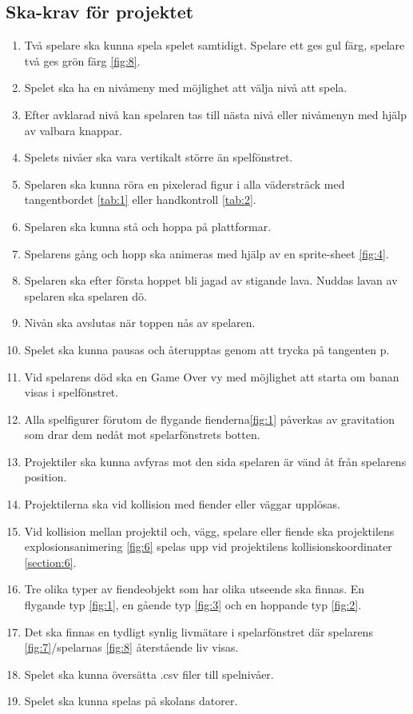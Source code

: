 \documentclass{TDP005mall}
\begin{document}
\subsection{Ska-krav för projektet} %
\begin{enumerate}
\item Två spelare ska kunna spela spelet samtidigt. Spelare ett ges gul färg, spelare två ges grön färg \ref{fig:8}.
\item Spelet ska ha en nivåmeny med möjlighet att välja nivå att spela.
\item Efter avklarad nivå kan spelaren tas till nästa nivå eller nivåmenyn med hjälp av valbara knappar. 
\item Spelets nivåer ska vara vertikalt större än spelfönstret.
\item Spelaren ska kunna röra en pixelerad figur i alla vädersträck med tangentbordet \ref{tab:1} eller handkontroll \ref{tab:2}.
\item Spelaren ska kunna stå och hoppa på plattformar.
\item Spelarens gång och hopp ska animeras med hjälp av en sprite-sheet \ref{fig:4}.
\item Spelaren ska efter första hoppet bli jagad av stigande lava. Nuddas lavan av spelaren ska spelaren dö.
\item Nivån ska avslutas när toppen nås av spelaren.
\item Spelet ska kunna pausas och återupptas genom att trycka på tangenten p.
\item Vid spelarens död ska en Game Over vy med möjlighet att starta om banan visas i spelfönstret.
\item Alla spelfigurer förutom de flygande fienderna\ref{fig:1} påverkas av gravitation som drar dem nedåt mot spelarfönstrets botten.
\item Projektiler ska kunna avfyras mot den sida spelaren är vänd åt från spelarens position.
\item Projektilerna ska vid kollision med fiender eller väggar upplösas.
\item Vid kollision mellan projektil och, vägg, spelare eller fiende ska projektilens explosionsanimering \ref{fig:6} spelas upp vid projektilens kollisionskoordinater \ref{section:6}.
\item Tre olika typer av fiendeobjekt som har olika utseende ska finnas. En flygande typ \ref{fig:1}, en gående typ \ref{fig:3} och en hoppande typ \ref{fig:2}.
\item Det ska finnas en tydligt synlig livmätare i spelarfönstret där spelarens \ref{fig:7}/spelarnas \ref{fig:8} återstående liv visas.
\item Spelet ska kunna översätta .csv filer till spelnivåer.
\item Spelet ska kunna spelas på skolans datorer.
\end{enumerate}
\end{document}
